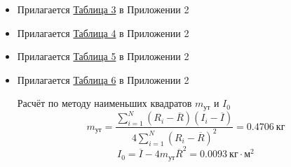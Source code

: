 \begin{itemize}
    \item Прилагается \hyperlink{table3}{Таблица 3} в Приложении 2
    \item Прилагается \hyperlink{table4}{Таблица 4} в Приложении 2
    \item Прилагается \hyperlink{table5}{Таблица 5} в Приложении 2
    \item Прилагается \hyperlink{table6}{Таблица 6} в Приложении 2

    Расчёт по методу наименьших квадратов $m_\text{ут}$ и $I_0$ \\
    \[
        m_\text{ут} = \frac{\sum_{i=1}^{N} \left( R_i - \overline{R} \right) \left( I_i - \overline{I} \right)}{4\sum_{i=1}^{N} \left( R_i - \overline{R} \right)^2} = 0.4706 \ \text{кг}
    \]
    \[
        I_0 = \overline{I} - 4m_{\text{ут}}\overline{R}^2 = 0.0093 \ \text{кг} \cdot \text{м}^2
    \]
\end{itemize}